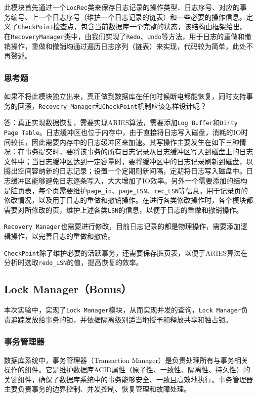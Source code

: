 \documentclass[12pt]{article}
\begin{document}
    此模块首先通过一个\texttt{LocRec}类来保存日志记录的操作类型、日志序号、对应的事务编号、上一个日志序号（维护一个日志记录的链表）和一些必要的操作信息。定义了\texttt{CheckPoint}检查点，包含当前数据库一个完整的状态，该结构由框架给出。在\texttt{RecoveryManager}类中，由我们实现了\texttt{Redo}、\texttt{Undo}等方法，用于日志的重做和撤销操作，重做和撤销均通过遍历日志序列（链表）来实现，代码较为简单，此处不再赘述。

    \subsubsection{思考题}
    如果不将此模块独立出来，真正做到数据库在任何时候断电都能恢复，同时支持事务的回滚，\texttt{Recovery Manager}和\texttt{CheckPoint}机制应该怎样设计呢？
    
    答：真正实现数据恢复，需要实现ARIES算法，需要添加\texttt{Log Buffer}和\texttt{Dirty Page Table}。日志缓冲区也位于内存中，由于直接将日志写入磁盘，消耗的IO时间较长，因此需要内存中的日志缓冲区来加速。其写操作主要发生在如下三种情况：在事务提交时，要将该事务的所有日志记录从日志缓冲区写入到磁盘上的日志文件中；当日志缓冲区达到一定容量时，要将缓冲区中的日志记录刷新到磁盘，以腾出空间容纳新的日志记录；设置一个定期刷新间隔，定期将日志写入磁盘中。日志缓冲区能够避免日志逐条写入，大大增加了IO效率。另外一个需要添加的结构是脏页表，每个页需要维护\texttt{page\_id}、\texttt{page\_LSN}、\texttt{rec\_LSN}等信息，用于记录页的修改情况，以及用于日志的重做和撤销操作。在进行各类修改操作时，各个模块都需要对所修改的页，维护上述各类\texttt{LSN}的信息，以便于日志的重做和撤销操作。

    \texttt{Recovery Manager}也需要进行修改，目前日志记录的都是物理操作，需要添加逻辑操作，以完善日志的重做和撤销。

    \texttt{CheckPoint}除了维护必要的活跃事务，还需要保存脏页表，以便于ARIES算法在分析时选取\texttt{redo\_LSN}的值，提高恢复的效率。

    \subsection{Lock Manager（Bonus）}
    本次实验中，实现了\texttt{Lock Manager}模块，从而实现并发的查询，\texttt{Lock Manager}负责追踪发放给事务的锁，并依据隔离级别适当地授予和释放共享和独占锁。

    \subsubsection{事务管理器}
    数据库系统中，事务管理器（Transaction Manager）是负责处理所有与事务相关操作的组件。它是维护数据库ACID属性（原子性、一致性、隔离性、持久性）的关键组件，确保了数据库系统中的事务能够安全、一致且高效地执行。事务管理器主要负责事务的边界控制、并发控制、恢复管理和故障处理。
\end{document}

